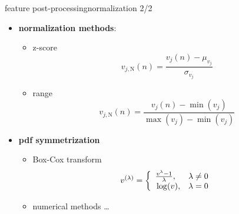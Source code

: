 		\begin{frame}{feature post-processing}{normalization 2/2}
            \begin{itemize}
                \item   \textbf{normalization methods}:
                    \begin{itemize}
                        \item   z-score \[v_{j,\mathrm{N}}(n) = \frac{v_j(n) - \mu_{v_j}}{\sigma_{v_j}}\]
                        \item   range \[v_{j,\mathrm{N}}(n) = \frac{v_j(n) - \min(v_j)}{\max(v_j)-\min(v_j)}\]
                    \end{itemize}
                \item   \textbf{pdf symmetrization}
                    \begin{itemize}
                        \item Box-Cox transform
                            \begin{eqnarray*}
                                v^{(\lambda)} = \left\{ 
                                                \begin{array}{ll} 
                                                    \frac{v^\lambda - 1}{\lambda}, 		& \lambda \neq 0\\ 
                                                    \vphantom{\frac{1}{1}} 	\log(v), 	& \lambda = 0 \\ 
                                                \end{array} 
                                                \right. 
                            \end{eqnarray*}
                        \item   numerical methods \ldots
                    \end{itemize}
            \end{itemize}
             
		\end{frame}
        
